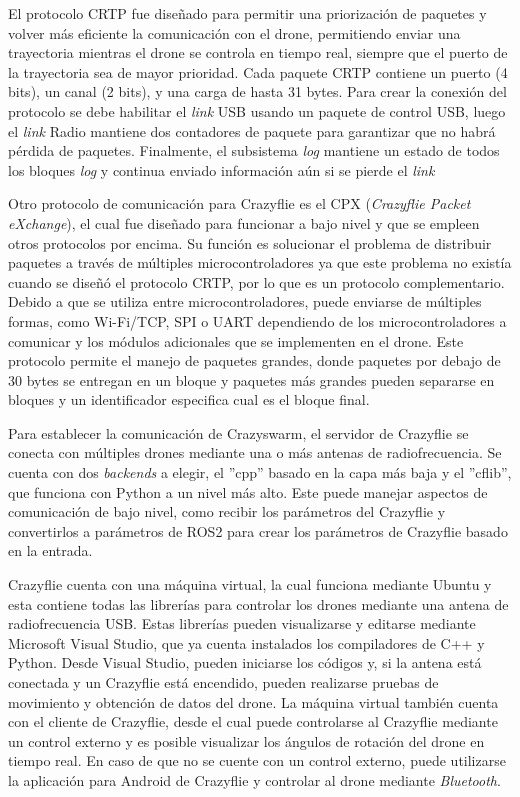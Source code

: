 El protocolo CRTP fue diseñado para permitir una priorización de paquetes y volver más eficiente la comunicación con el drone, permitiendo enviar una trayectoria mientras el drone se controla en tiempo real, siempre que el puerto de la trayectoria sea de mayor prioridad. Cada paquete CRTP contiene un puerto (4 bits), un canal (2 bits), y una carga de hasta 31 bytes. Para crear la conexión del protocolo se debe habilitar el \emph{link} USB usando un paquete de control USB, luego el \emph{link} Radio mantiene dos contadores de paquete para garantizar que no habrá pérdida de paquetes. Finalmente, el subsistema \emph{log} mantiene un estado de todos los bloques \emph{log} y continua enviado información aún si se pierde el \emph{link}\cite{CRTP}

Otro protocolo de comunicación para Crazyflie es el CPX (\emph{Crazyflie Packet eXchange}), el cual fue diseñado para funcionar a bajo nivel y que se empleen otros protocolos por encima. Su función es solucionar el problema de distribuir paquetes a través de múltiples microcontroladores ya que este problema no existía cuando se diseñó el protocolo CRTP, por lo que es un protocolo complementario. Debido a que se utiliza entre microcontroladores, puede enviarse de múltiples formas, como Wi-Fi/TCP, SPI o UART dependiendo de los microcontroladores a comunicar y los módulos adicionales que se implementen en el drone. Este protocolo permite el manejo de paquetes grandes, donde paquetes por debajo de 30 bytes se entregan en un bloque y paquetes más grandes pueden separarse en bloques y un identificador especifica cual es el bloque final.

Para establecer la comunicación de Crazyswarm, el servidor de Crazyflie se conecta con múltiples drones mediante una o más antenas de radiofrecuencia. Se cuenta con dos \emph{backends} a elegir, el ''cpp'' basado en la capa más baja y el ''cflib'', que funciona con Python a un nivel más alto. Este puede manejar aspectos de comunicación de bajo nivel, como recibir los parámetros del Crazyflie y convertirlos a parámetros de ROS2 para crear los parámetros de Crazyflie basado en la entrada.

Crazyflie cuenta con una máquina virtual, la cual funciona mediante Ubuntu y esta contiene todas las librerías para controlar los drones mediante una antena de radiofrecuencia USB. Estas librerías pueden visualizarse y editarse mediante Microsoft Visual Studio, que ya cuenta instalados los compiladores de C++ y Python. Desde Visual Studio, pueden iniciarse los códigos y, si la antena está conectada y un Crazyflie está encendido, pueden realizarse pruebas de movimiento y obtención de datos del drone. La máquina virtual también cuenta con el cliente de Crazyflie, desde el cual puede controlarse al Crazyflie mediante un control externo y es posible visualizar los ángulos de rotación del drone en tiempo real. En caso de que no se cuente con un control externo, puede utilizarse la aplicación para Android de Crazyflie y controlar al drone mediante \emph{Bluetooth}.

